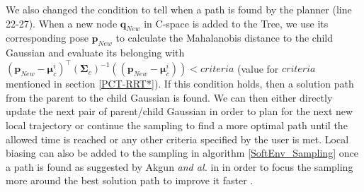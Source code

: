 \documentclass[letterpaper, 10 pt, conference]{ieeeconf}  %
\newcommand{\trsp}{{\!\scriptscriptstyle\top}}
\newcommand{\mb}[1]{{\boldsymbol{#1}}}
\begin{document}
We also changed the condition to tell when a path is found by the planner (line 22-27). When a new node $\mb{q}_{New}$ in C-space is added to the Tree, we use its corresponding pose $\mb{p}_{New}$ to calculate the Mahalanobis distance to the child Gaussian and evaluate its belonging with $(\mb{p}_{New}-\mb{\mu}_{c}^i)^{\trsp}(\mb{\Sigma}_{c})^{-1} ((\mb{p}_{New}-\mb{\mu}_{c}^i)) < criteria$ (value for $criteria$ mentioned in section \ref{PCT-RRT*}). If this condition holds, then a solution path from the parent to the child Gaussian  is found. We can then either directly update the next pair of parent/child Gaussian in order to plan for the next new local trajectory or continue the sampling to find a more optimal path until the allowed time is reached or any other criteria specified by the user is met. Local biasing can also be added to the sampling in algorithm \ref{SoftEnv_Sampling} once a path is found as suggested by Akgun \textit{and al.} in \cite{BarisRRT} in order to focus the sampling more around the best solution path to improve it faster . \\
 
\end{document}
